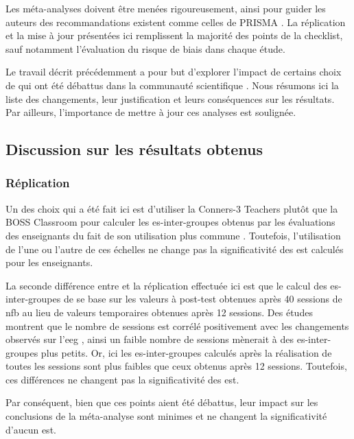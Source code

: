 Les méta-analyses doivent être menées rigoureusement, ainsi pour guider les auteurs des recommandations existent comme celles de PRISMA \citep{Moher2009}.
La réplication et la mise à jour présentées ici remplissent la majorité des points de la checklist, sauf notamment l'évaluation du risque de biais dans chaque étude.
 
Le travail décrit précédemment a pour but d'explorer l'impact de certains choix de \citet{Cortese2016} qui ont été débattus dans la communauté scientifique 
\citep{Micoulaud2016}. Nous résumons ici la liste des changements, leur justification et leurs conséquences sur les résultats. Par ailleurs, l'importance de mettre 
à jour ces analyses est soulignée.

\subsection{Discussion sur les résultats obtenus} \label{replication_and_update}

\subsubsection{Réplication}

Un des choix qui a été fait ici est d'utiliser la Conners-3 Teachers \citep{Conners2008} plutôt que la BOSS Classroom \citep{Shapiro2010} 
pour calculer les \gls{es}-inter-groupes obtenus par les évaluations des enseignants du fait de son utilisation plus commune \citep{Christiansen2014, Bluschke2016}.
Toutefois, l'utilisation de l'une ou l'autre de ces échelles ne change pas la significativité des \gls{est} calculés pour les enseignants. 

La seconde différence entre \citep{Cortese2016} et la réplication effectuée ici est que le calcul des \gls{es}-inter-groupes de \citet{Arnold2014} se base 
sur les valeurs à post-test obtenues après 40 sessions de \gls{nfb} au lieu de valeurs temporaires obtenues après 12 sessions. Des études montrent
que le nombre de sessions est corrélé positivement avec les changements observés sur l'\gls{eeg} \citep{Vernon2004}, ainsi un faible nombre de sessions mènerait
à des \gls{es}-inter-groupes plus petits. Or, ici les \gls{es}-inter-groupes calculés après la réalisation de toutes les sessions sont plus faibles que ceux 
obtenus après 12 sessions. Toutefois, ces différences ne changent pas la significativité des \gls{est}. 

Par conséquent, bien que ces points aient été débattus, leur impact sur les conclusions de la méta-analyse sont minimes et ne changent la significativité
d'aucun \gls{est}. 


